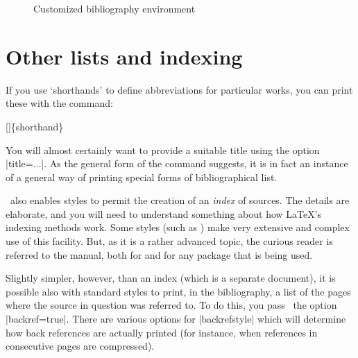 \begin{figure}
\caption{Customized bibliography environment\label{custom-env}}
\end{figure}

\section{Other lists and indexing}

If you use `shorthands' to define abbreviations for particular works, you can print these with the command:
\begin{pseudoverb}
  \centering
  []\{shorthand\}
\end{pseudoverb}

You will almost certainly want to provide a suitable title using the
option |title=...|. As the general form of the command suggests, it is
in fact an instance of a general way of printing special forms of
bibliographical list.

\biblatex\ also enables styles to permit the creation of an
\emph{index} of sources. The details are elaborate, and you will need
to understand something about how \LaTeX's indexing methods work. Some
styles (such as ) make very extensive and complex use
of this facility. But, as it is a rather advanced topic, the curious
reader is referred to the manual, both for \biblatex{}
and for any package that is being used.

Slightly simpler, however, than an index (which is a separate
document), it is possible also with standard styles to print, in the
bibliography, a list of the pages where the source in question was
referred to. To do this, you pass \biblatex\ the option
|backref=true|. There are various options for
|backrefstyle| which will determine how back references are actually
printed (for instance, when references in consecutive pages are
compressed).

